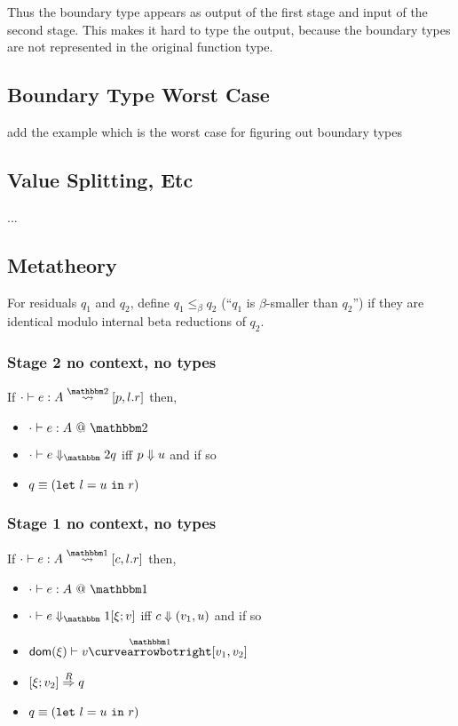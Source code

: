 Thus the boundary type appears as output of the first stage and input of the second stage.
This makes it hard to type the output, because the boundary types are not represented in the original function type.

\subsection {Boundary Type Worst Case}

\TODO add the example which is the worst case for figuring out boundary types



\subsection{Value Splitting, Etc}

...

\subsection{Metatheory}

\begin{definition}
For residuals $q_1$ and $q_2$, define $q_1 \le_\beta q_2$ (``$q_1$ is $\beta$-smaller than $q_2$'') if they are
identical modulo internal beta reductions of $q_2$.
\end{definition}

\subsubsection{Stage 2 no context, no types}

\begin{theorem}
If $\cdot\vdash e : A \splittwosym [p,l.r]$ then,
\begin{itemize}
\item $\cdot \vdash e : A~@~\bbtwo$ 
\item $\diatwo [\cdot] e q$ iff ${p} \Downarrow {u}$ and if so
\item $q \equiv ({\tt let}~{l} = {u}~{\tt in}~{r})$
\end{itemize}
\end{theorem}

\subsubsection{Stage 1 no context, no types}

\begin{theorem}
If $\cdot\vdash e : A \splitonesym [c,l.r]$ then,
\begin{itemize}
\item $\typesone [\cdot] e A$ 
\item $\diaone [\cdot] e {\xi;v}$ iff ${c} \Downarrow {(v_1,u)}$ and if so
\item $\dom \xi \vdash v \vsplito [v_1,v_2]$
\item $[{\xi};{v_2}]\overset{R}\Rightarrow{q}$
\item $q \equiv ({\tt let}~{l} = {u}~{\tt in}~{r})$
\end{itemize}
\end{theorem}

